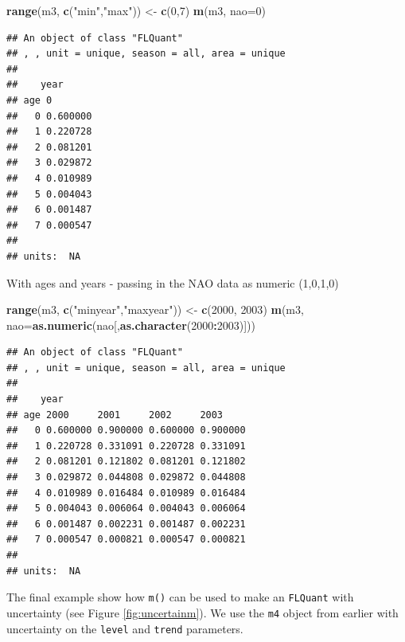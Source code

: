 \documentclass[
]{book}
\newenvironment{Shaded}{\begin{snugshade}}{\end{snugshade}}
\newcommand{\AttributeTok}[1]{\textcolor[rgb]{0.13,0.29,0.53}{#1}}
\newcommand{\DecValTok}[1]{\textcolor[rgb]{0.00,0.00,0.81}{#1}}
\newcommand{\FunctionTok}[1]{\textcolor[rgb]{0.13,0.29,0.53}{\textbf{#1}}}
\newcommand{\NormalTok}[1]{#1}
\newcommand{\OtherTok}[1]{\textcolor[rgb]{0.56,0.35,0.01}{#1}}
\newcommand{\SpecialCharTok}[1]{\textcolor[rgb]{0.81,0.36,0.00}{\textbf{#1}}}
\newcommand{\StringTok}[1]{\textcolor[rgb]{0.31,0.60,0.02}{#1}}
\begin{document}
\begin{Shaded}
\begin{Highlighting}[]
\FunctionTok{range}\NormalTok{(m3, }\FunctionTok{c}\NormalTok{(}\StringTok{"min"}\NormalTok{,}\StringTok{"max"}\NormalTok{)) }\OtherTok{\textless{}{-}} \FunctionTok{c}\NormalTok{(}\DecValTok{0}\NormalTok{,}\DecValTok{7}\NormalTok{)}
\FunctionTok{m}\NormalTok{(m3, }\AttributeTok{nao=}\DecValTok{0}\NormalTok{)}
\end{Highlighting}
\end{Shaded}

\begin{verbatim}
## An object of class "FLQuant"
## , , unit = unique, season = all, area = unique
## 
##    year
## age 0       
##   0 0.600000
##   1 0.220728
##   2 0.081201
##   3 0.029872
##   4 0.010989
##   5 0.004043
##   6 0.001487
##   7 0.000547
## 
## units:  NA
\end{verbatim}

With ages and years - passing in the NAO data as numeric (1,0,1,0)

\begin{Shaded}
\begin{Highlighting}[]
\FunctionTok{range}\NormalTok{(m3, }\FunctionTok{c}\NormalTok{(}\StringTok{"minyear"}\NormalTok{,}\StringTok{"maxyear"}\NormalTok{)) }\OtherTok{\textless{}{-}} \FunctionTok{c}\NormalTok{(}\DecValTok{2000}\NormalTok{, }\DecValTok{2003}\NormalTok{)}
\FunctionTok{m}\NormalTok{(m3, }\AttributeTok{nao=}\FunctionTok{as.numeric}\NormalTok{(nao[,}\FunctionTok{as.character}\NormalTok{(}\DecValTok{2000}\SpecialCharTok{:}\DecValTok{2003}\NormalTok{)]))}
\end{Highlighting}
\end{Shaded}

\begin{verbatim}
## An object of class "FLQuant"
## , , unit = unique, season = all, area = unique
## 
##    year
## age 2000     2001     2002     2003    
##   0 0.600000 0.900000 0.600000 0.900000
##   1 0.220728 0.331091 0.220728 0.331091
##   2 0.081201 0.121802 0.081201 0.121802
##   3 0.029872 0.044808 0.029872 0.044808
##   4 0.010989 0.016484 0.010989 0.016484
##   5 0.004043 0.006064 0.004043 0.006064
##   6 0.001487 0.002231 0.001487 0.002231
##   7 0.000547 0.000821 0.000547 0.000821
## 
## units:  NA
\end{verbatim}

The final example show how \texttt{m()} can be used to make an \texttt{FLQuant} with uncertainty (see Figure \ref{fig:uncertainm}). We use the \texttt{m4} object from earlier with uncertainty on the \texttt{level} and \texttt{trend} parameters.
\end{document}
